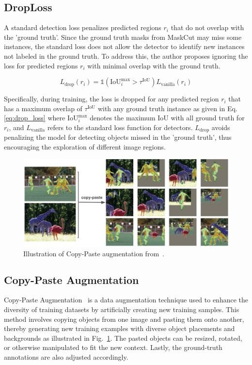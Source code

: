 \subsection{DropLoss}
A standard detection loss penalizes predicted regions \( r_i \) that do not overlap with the 'ground truth'. Since the ground truth masks from MaskCut may miss some instances, the standard loss does not allow the detector to identify new instances not labeled in the ground truth. To address this, the author proposes ignoring the loss for predicted regions \( r_i \) with minimal overlap with the ground truth.

\begin{equation}
	\label{eq:drop_loss}
L_{\text{drop}}(r_i) = \mathds{1}(\text{IoU}_i^{\text{max}} > \tau^{\text{IoU}}) L_{\text{vanilla}}(r_i)
\end{equation}

Specifically, during training, the loss is dropped for any predicted region \( r_i \) that has a maximum overlap of \( \tau^{\text{IoU}} \) with any ground truth instance as given in Eq. \ref{eq:drop_loss} where \(\text{IoU}_i^{\text{max}}\) denotes the maximum IoU with all ground truth for \( r_i \), and \( L_{\text{vanilla}} \) refers to the standard loss function for detectors. \( L_{\text{drop}} \) avoids penalizing the model for detecting objects missed in the 'ground truth', thus encouraging the exploration of different image regions.

\begin{figure}
	\centering
	\includegraphics[width=1.0\textwidth]{Images/main/copy-paste.png}
	\caption[\textbf{Copy-Paste Augmentation}]{Illustration of Copy-Paste augmentation from~\cite{ghiasi2021simplecopypastestrongdata}.}
	\label{fig:copy_paste_aug}
\end{figure}

\subsection{Copy-Paste Augmentation}
Copy-Paste Augmentation~\cite{ghiasi2021simplecopypastestrongdata} is a data augmentation technique used to enhance the diversity of training datasets by artificially creating new training samples. This method involves copying objects from one image and pasting them onto another, thereby generating new training examples with diverse object placements and backgrounds as illustrated in Fig.~\ref{fig:copy_paste_aug}. The pasted objects can be resized, rotated, or otherwise manipulated to fit the new context. Lastly, the ground-truth annotations are also adjusted accordingly.

